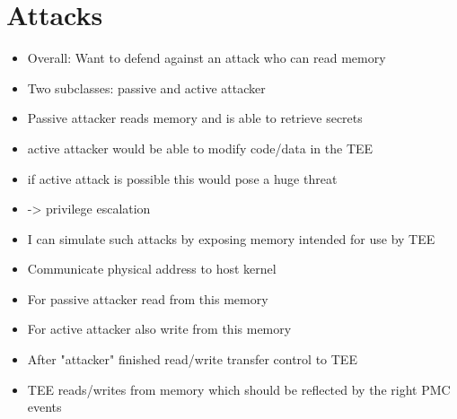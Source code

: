 \section{Attacks}
\begin{itemize}
    \item Overall: Want to defend against an attack who can read memory
    \item Two subclasses: passive and active attacker
    \item Passive attacker reads memory and is able to retrieve secrets
    \item active attacker would be able to modify code/data in the TEE
    \item if active attack is possible this would pose a huge threat
    \item -> privilege escalation
    \item I can simulate such attacks by exposing memory intended for use by TEE
    \item Communicate physical address to host kernel
    \item For passive attacker read from this memory
    \item For active attacker also write from this memory
    \item After "attacker" finished read/write transfer control to TEE
    \item TEE reads/writes from memory which should be reflected by the right
          PMC events
\end{itemize}


\cleardoublepage

